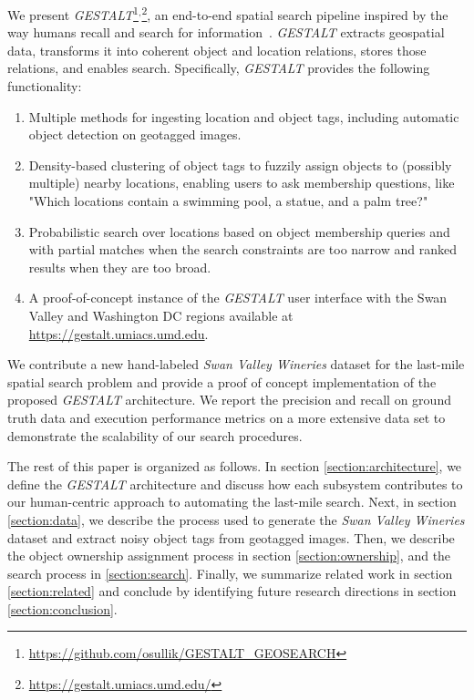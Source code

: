 We present \emph{GESTALT}\footnote{\url{https://github.com/osullik/GESTALT_GEOSEARCH}}$^,$\footnote{\url{https://gestalt.umiacs.umd.edu/}}, an end-to-end spatial search pipeline inspired by the way humans recall and search for information~\cite{Helbing2020, Oliveira2016, Weisberg2016}.
\emph{GESTALT} extracts geospatial data, transforms it into coherent object and location relations, stores those relations, and enables search. 
Specifically, \emph{GESTALT} provides the following functionality:
\begin{enumerate}
    \item Multiple methods for ingesting location and object tags, including automatic object detection on geotagged images.
    \item Density-based clustering of object tags to fuzzily assign objects to (possibly multiple) nearby locations, enabling users to ask membership questions, like "Which locations contain a swimming pool, a statue, and a palm tree?"
    \item Probabilistic search over locations based on object membership queries and with partial matches when the search constraints are too narrow and ranked results when they are too broad.
    \item A proof-of-concept instance of the \emph{GESTALT} user interface with the Swan Valley and Washington DC regions available at \url{https://gestalt.umiacs.umd.edu}.
\end{enumerate}

We contribute a new hand-labeled \textit{Swan Valley Wineries} dataset for the last-mile spatial search problem and provide a proof of concept implementation of the proposed \emph{GESTALT} architecture. We report the precision and recall on ground truth data and execution performance metrics on a more extensive data set to demonstrate the scalability of our search procedures.

The rest of this paper is organized as follows. In section \ref{section:architecture}, we define the \emph{GESTALT} architecture and discuss how each subsystem contributes to our human-centric approach to automating the last-mile search. 
Next, in section \ref{section:data}, we describe the process used to generate the \textit{Swan Valley Wineries} dataset and extract noisy object tags from geotagged images. Then, we describe the object ownership assignment process in section \ref{section:ownership}, and the search process in \ref{section:search}. 
Finally, we summarize related work in section \ref{section:related} and conclude by identifying future research directions in section \ref{section:conclusion}.









